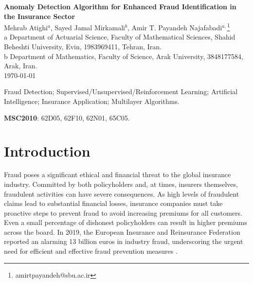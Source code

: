 \documentclass[12pt]{article}
\begin{document}
\begin{center}
{\bf Anomaly Detection Algorithm for Enhanced Fraud
Identification in the Insurance Sector}\\
{\sc Mehrab Atighi$^{a}$, Sayed Jamal Mirkamali$^{b}$, 
 Amir T. Payandeh Najafabadi$^{a,}$\footnote{amirtpayandeh@sbu.ac.ir}}\\
a Department of Actuarial Science, Faculty of Mathematical
Sciences, Shahid Beheshti University,
Evin, 1983969411, Tehran, Iran.\\
b Department of Mathematics, Faculty of Science, Arak University,
3848177584, Arak, Iran.\\
\today
\end{center}
\begin{abstract}
Detecting fraud in the vast databases of the insurance industry
remains an ongoing challenge. Existing algorithms often flag
numerous suspicious cases, resulting in time-consuming and costly
investigations. To address this issue, we propose a novel,
sequential, and multilayered algorithm that achieves a high level
of accuracy while presenting a manageable number of cases for
expert review. In this article, we evaluate the performance of our
algorithm using real-world data, demonstrating its impressive
accuracy of over 95\% and notable speed. This approach offers a
significant advancement in fraud detection for the insurance
sector.
 \end{abstract}


 Fraud Detection;
Supervised/Unsupervised/Reinforcement Learning; Artificial
Intelligence; Insurance Application; Multilayer Algorithms.

{\bf MSC2010}: {62D05, 62F10, 62N01, 65C05.}

\section{Introduction}

Fraud poses a significant ethical and financial threat to the
global insurance industry. Committed by both policyholders and, at
times, insurers themselves, fraudulent activities can have severe
consequences. As high levels of fraudulent claims lead to
substantial financial losses, insurance companies must take
proactive steps to prevent fraud to avoid increasing premiums for
all customers. Even a small percentage of dishonest policyholders
can result in higher premiums across the board. In 2019, the
European Insurance and Reinsurance Federation reported an alarming
13 billion euros in industry fraud, underscoring the urgent need
for efficient and effective fraud prevention measures \cite{A61}.
\end{document}
